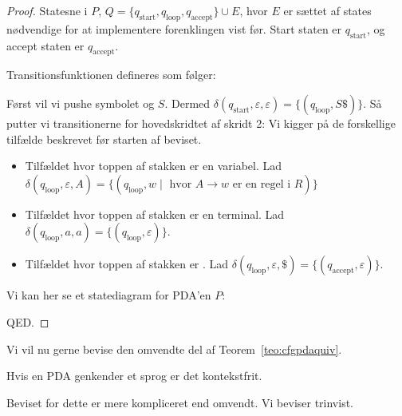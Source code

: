 \begin{proof}
    Statesne i $P$, $Q = \{q_{\text{start}}, q_{\text{loop}}, q_{\text{accept}}\} \cup E$, hvor $E$  er sættet af states nødvendige for at implementere forenklingen vist før. Start staten er $q_{\text{start}}$, og accept staten er $q_{\text{accept}}$.

    Transitionsfunktionen defineres som følger:

    Først vil vi pushe symbolet \textdollar og $S$. Dermed $\delta(q_{\text{start}}, \varepsilon, \varepsilon) = \{ (q_{\text{loop}}, S \mathdollar )\}$. Så putter vi transitionerne for hovedskridtet af skridt 2:
    Vi kigger på de forskellige tilfælde beskrevet før starten af beviset.
    \begin{itemize}
      \item Tilfældet hvor toppen af stakken er en variabel. Lad $\delta(q_{\text{loop}}, \varepsilon, A)  =\{ (q_{\text{loop}}, w \; | \; \text{ hvor } A \rightarrow w \text{ er en regel i }R)\}$
      \item Tilfældet hvor toppen af stakken er en terminal. Lad $\delta(q_{\text{loop}}, a, a) = \{(q_{\text{loop}}, \varepsilon)\}$.
      \item Tilfældet hvor toppen af stakken er \textdollar. Lad $\delta(q_{\text{loop}}, \varepsilon, \mathdollar) = \{(q_{\text{accept}}, \varepsilon)\}$.
    \end{itemize}


    Vi kan her se et statediagram for PDA'en $P$:

QED.
\end{proof}

Vi vil nu gerne bevise den omvendte del af Teorem~\ref{teo:cfgpdaquiv}.
\begin{lemma}
Hvis en PDA genkender et sprog er det kontekstfrit.
\end{lemma}
Beviset for dette er mere kompliceret end omvendt. Vi beviser trinvist.


